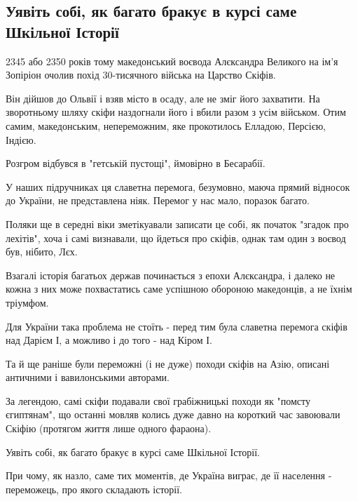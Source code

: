  
 
 
 
 
\subsection{Уявіть собі, як багато бракує в курсі саме Шкільної Історії}

2345 або 2350 років тому македонський воєвода Алєксандра Великого на ім'я
Зопіріон очолив похід 30-тисячного війська на Царство Скіфів. 

Він дійшов до Ольвії і взяв місто в осаду, але не зміг його захватити. На
зворотньому шляху скіфи наздогнали його і вбили разом з усім військом. Отим
самим, македонським, непереможним, яке прокотилось Елладою, Персією, Індією. 

Розгром відбувся в "гетській пустощі", ймовірно в Бесарабії. 

У наших підручниках ця славетна перемога, безумовно, маюча прямий відносок до
України, не представлена ніяк. Перемог у нас мало, поразок багато. 

Поляки ще в середні віки зметікуавали записати це собі, як початок "згадок про
лехітів", хоча і самі визнавали, що йдеться про скіфів, однак там один з воєвод
був, нібито, Лєх.

Взагалі історія багатьох держав починається з епохи Алєксандра, і далеко не
кожна з них може похвастатись саме успішною обороною македонців, а не їхнім
тріумфом. 

Для України така проблема не стоїть - перед тим була славетна перемога скіфів над Дарієм І, а можливо і до того - над Кіром І. 

Та й ще раніше були переможні (і не дуже) походи скіфів на Азію, описані
античними і вавилонськими авторами. 

За легендою, самі скіфи подавали свої грабіжницькі походи як "помсту
єгиптянам", що останні мовляв колись дуже давно на короткий час завоювали
Скіфію (протягом життя лише одного фараона). 

Уявіть собі, як багато бракує в курсі саме Шкільної Історії. 

При чому, як назло, саме тих моментів, де Україна виграє, де її населення - переможець, про якого складають історії. 

